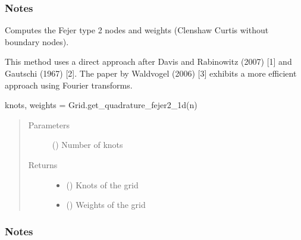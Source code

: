 \documentclass[letterpaper,10pt,english,openany,oneside]{sphinxmanual}
\begin{document}
\begin{fulllineitems}
\begin{fulllineitems}
\begin{quote}
\begin{description}
\end{description}\end{quote}
\subsubsection*{Notes}

\end{fulllineitems}


\begin{fulllineitems}
\label{\detokenize{pygpc:pygpc.Grid.Grid.get_quadrature_fejer2_1d}}
Computes the Fejer type 2 nodes and weights (Clenshaw Curtis without boundary nodes).

This method uses a direct approach after Davis and Rabinowitz (2007) {[}1{]} and Gautschi (1967) {[}2{]}.
The paper by Waldvogel (2006) {[}3{]} exhibits a more efficient approach using Fourier transforms.

knots, weights = Grid.get\_quadrature\_fejer2\_1d(n)
\begin{quote}\begin{description}
\item[{Parameters}] \leavevmode
{} () \textendash{} Number of knots

\item[{Returns}] \leavevmode
\begin{itemize}
\item {} 
 () \textendash{} Knots of the grid

\item {} 
 () \textendash{} Weights of the grid

\end{itemize}


\end{description}\end{quote}
\subsubsection*{Notes}


\end{fulllineitems}
\end{fulllineitems}
\end{document}
